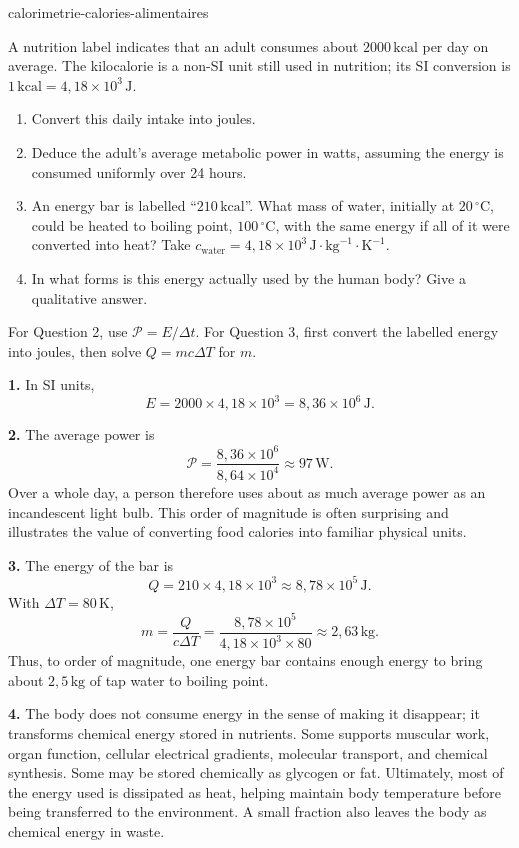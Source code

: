 \begin{exo}{calorimetrie-calories-alimentaires}

A nutrition label indicates that an adult consumes about $2000\,\text{kcal}$ per day on average. The kilocalorie is a non-SI unit still used in nutrition; its SI conversion is $1\,\text{kcal}=4{,}18\times10^3\,\text{J}$.

\begin{enumerate}
  \item Convert this daily intake into joules.
  \item Deduce the adult's average metabolic power in watts, assuming the energy is consumed uniformly over 24 hours.
  \item An energy bar is labelled ``$210\,\text{kcal}$''. What mass of water, initially at $20\,^\circ\text{C}$, could be heated to boiling point, $100\,^\circ\text{C}$, with the same energy if all of it were converted into heat? Take $c_{\text{water}}=4{,}18\times10^3\,\text{J}\!\cdot\!\text{kg}^{-1}\!\cdot\!\text{K}^{-1}$.
  \item In what forms is this energy actually used by the human body? Give a qualitative answer.
\end{enumerate}

\begin{indication}
For Question 2, use $\mathcal P=E/\Delta t$. For Question 3, first convert the labelled energy into joules, then solve $Q=mc\Delta T$ for $m$.
\end{indication}

\begin{solution}
\textbf{1.} In SI units,
\[
E=2000\times4{,}18\times10^3
=8{,}36\times10^6\,\text{J}.
\]

\textbf{2.} The average power is
\[
\mathcal P=\frac{8{,}36\times10^6}{8{,}64\times10^4}\approx97\,\text{W}.
\]
Over a whole day, a person therefore uses about as much average power as an incandescent light bulb. This order of magnitude is often surprising and illustrates the value of converting food calories into familiar physical units.

\textbf{3.} The energy of the bar is
\[
Q=210\times4{,}18\times10^3\approx8{,}78\times10^5\,\text{J}.
\]
With $\Delta T=80\,\text{K}$,
\[
m=\frac{Q}{c\Delta T}
=\frac{8{,}78\times10^5}{4{,}18\times10^3\times80}
\approx2{,}63\,\text{kg}.
\]
Thus, to order of magnitude, one energy bar contains enough energy to bring about $2{,}5\,\text{kg}$ of tap water to boiling point.

\textbf{4.} The body does not consume energy in the sense of making it disappear; it transforms chemical energy stored in nutrients. Some supports muscular work, organ function, cellular electrical gradients, molecular transport, and chemical synthesis. Some may be stored chemically as glycogen or fat. Ultimately, most of the energy used is dissipated as heat, helping maintain body temperature before being transferred to the environment. A small fraction also leaves the body as chemical energy in waste.
\end{solution}
\end{exo}
